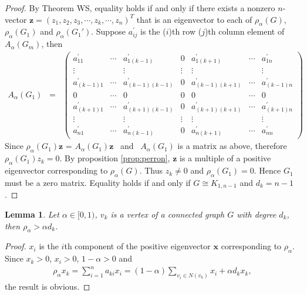 \documentclass[amsthm]{elsart}
\newtheorem{lemma}{Lemma}[section]
\begin{document}
\begin{proof}
By Theorem WS, equality holds if and only if there exists a nonzero $n$-vector $\textbf{z} = (z_1, z_2,z_3, \cdots,z_k, \cdots, z_n)^T$ that is an eigenvector to each of $\rho _\alpha (G)$, $\rho _\alpha (G_1)$ and $\rho _\alpha (G_1')$. Suppose   $a_{ij}^{\prime}$ is the ($i$)th row ($j$)th column element of $A_\alpha(G_m)$, then
\begin{eqnarray} \label{matrix:G1}
A_\alpha(G_1) \;\;=\;\;
\begin{pmatrix}
a_{11}^{\prime} & \cdots & a_{1(k-1)}^{\prime} & 0 & a_{1(k+1)}^{\prime} & \cdots & a_{1n}^{\prime} \\
\vdots & {} & \vdots & \vdots & \vdots & {} & \vdots \\
a_{(k-1)1}^{\prime} & \cdots & a_{(k-1)(k-1)}^{\prime} & 0 & a_{(k-1)(k+1)}^{\prime} & \cdots & a_{(k-1)n}^{\prime} \\
0 & \cdots & 0 & 0 & 0 & \cdots & 0 \\
a_{(k+1)1}^{\prime} & \cdots & a_{(k+1)(k-1)}^{\prime} & 0 & a_{(k+1)(k+1)}^{\prime} & \cdots & a_{(k+1)n}^{\prime} \\
\vdots & {} & \vdots & \vdots & \vdots & {} & \vdots \\
a_{n1}^{\prime} & \cdots & a_{n(k-1)}^{\prime} & 0 & a_{n(k+1)}^{\prime} & \cdots & a_{nn}^{\prime}
\end{pmatrix}
\end{eqnarray}
Since $\rho _\alpha (G_1) \textbf{z}$ = $A_\alpha (G_1) \textbf{z}$ \  and \ $A_\alpha (G_1)$ is a matrix as above,
 therefore  $\rho _\alpha (G_1) z_k = 0$. By proposition \ref{prop:perron}, $\textbf{z}$ is a multiple of a positive eigenvector corresponding to $\rho _\alpha (G)$. Thus $z_k \neq 0$ and $\rho _\alpha (G_1) = 0$. Hence $G_1$ must be a zero matrix. Equality holds if and only if $G \cong K_{1,n-1}$ and $d_k = n - 1$.
\end{proof}


\begin{lemma} \label{lem:1}
Let $\alpha \in [0, 1)$, $v_k$ is a vertex of a connected graph $G$ with degree $d_k$, then $\rho _\alpha > \alpha d_k$.
\end{lemma}
\begin{proof}
$x_i$ is the $i$th component of the positive eigenvector $\textbf{x}$ corresponding to $\rho_\alpha$. Since $x_k > 0$, $x_i > 0$, $1-\alpha > 0$ and
\begin{eqnarray*}
\rho _\alpha x_k = \sum \limits_{i = 1}^{n} a_{ki} x_i = (1 - \alpha) \sum \limits_{v_i \in N(v_k)}^{} x_i + \alpha d_k x_k ,
\end{eqnarray*}
the result is obvious.
\end{proof}
\end{document}
